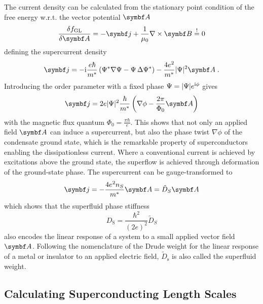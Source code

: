 \documentclass[../main.tex]{subfiles}
\begin{document}
The current density can be calculated from the stationary point condition of the free energy w.r.t. the vector potential \(\vb{A}\)
\begin{equation}
	\fdv{f_{\mathrm{GL}}}{\vb{A}} = -\vb{j} + \frac{1}{\mu_0} \nabla \times \vb{B} \overset{!}{=} 0
\end{equation}
defining the supercurrent density
\begin{equation}
	\vb{j} = -\iu \frac{e\hbar}{m^*} \left(\Psi^* \nabla \Psi - \Psi \adif{\Psi^*}\right) - \frac{4 e^2}{m^*} \vert \Psi \vert^2 \vb{A} \;.
	\label{eq:supercurrent density GL theory with phase and vector potential}
\end{equation}
Introducing the order parameter with a fixed phase \(\Psi = \vert \Psi \vert e^{\mathrm{i} \phi}\) gives
\begin{equation}
	\vb{j} = 2 e \vert \Psi \vert^2 \frac{\hbar}{m^*} \left(\nabla \phi - \frac{2 \pi}{\Phi_0} \vb{A} \right)
\end{equation}
with the magnetic flux quantum \(\Phi_0 = \frac{\pi \hbar}{e}\).
This shows that not only an applied field \(\vb{A}\) can induce a supercurrent, but also the phase twist \(\nabla \phi\) of the condensate ground state, which is the remarkable property of superconductors enabling the dissipationless current.
Where a conventional current is achieved by excitations above the ground state, the superflow is achieved through deformation of the ground-state phase.
The supercurrent can be gauge-transformed to
\begin{equation}
	\vb{j} = -\frac{4e^2 n_S}{m^*} \vb{A} = \tilde{D}_S \vb{A}
\end{equation}
which shows that the superfluid phase stiffness
\begin{equation}
	D_{\mathrm{S}} = \frac{\hbar^2}{(2e)^2} \tilde{D}_S
\end{equation}
also encodes the linear response of a system to a small applied vector field \(\vb{A}\).
Following the nomenclature of the Drude weight for the linear response of a metal or insulator to an applied electric field, \(\tilde{D}_{\mathrm{s}}\) is also called the superfluid weight.

\subsection*{Calculating Superconducting Length Scales}
\end{document}
